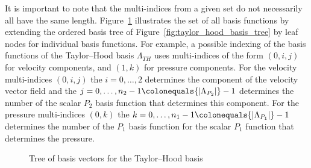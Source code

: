 \documentclass[a4paper,10pt,headings=normal,bibliography=totoc]{scrartcl}
\newcommand{\abs}[1]{{\lvert#1\rvert}}
\begin{document}
It is important to note that the multi-indices from a given set do not necessarily
all have the same length.
Figure~\ref{fig:taylor_hood_basis_function_tree} illustrates the set of all basis
functions by extending the ordered basis tree of Figure~\ref{fig:taylor_hood_basis_tree}
by leaf nodes for individual basis functions.
For example, a possible indexing of the basis functions of the Taylor--Hood basis $\Lambda_{TH}$
uses multi-indices of the form $(0,i,j)$ for velocity components, and $(1,k)$
for pressure components.
For the velocity multi-indices $(0,i,j)$ the $i = 0,\dots,2$ determines the component
of the velocity vector field and the $j = 0,\dots,n_2-1 \colonequals \abs{\Lambda_{P_2}}-1$ determines the number of the scalar $P_2$ basis
function that determines this component.
For the pressure multi-indices $(0,k)$ the $k= 0,\dots,n_1-1 \colonequals \abs{\Lambda_{P_1}}-1$ determines the number of the $P_1$ basis
function for the scalar $P_1$ function that determines the pressure.

\begin{figure}
    \begin{center}
    \end{center}
    \caption{Tree of basis vectors for the Taylor--Hood basis}
    \label{fig:taylor_hood_basis_function_tree}
\end{figure}
\end{document}

